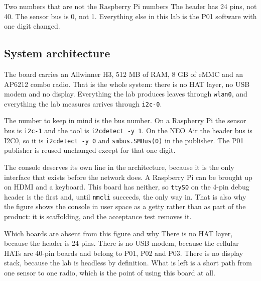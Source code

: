\begin{rulebox}{Two numbers that are not the Raspberry Pi numbers}
The header has 24 pins, not 40. The sensor bus is 0, not 1. Everything else in this lab is the P01 software with one digit changed.
\end{rulebox}

\subsection*{System architecture}


The board carries an Allwinner H3, 512 MB of RAM, 8 GB of eMMC and an AP6212 combo radio. That is the whole system: there is no HAT layer, no USB modem and no display. Everything the lab produces leaves through \texttt{wlan0}, and everything the lab measures arrives through \texttt{i2c-0}.

The number to keep in mind is the bus number. On a Raspberry Pi the sensor bus is \texttt{i2c-1} and the tool is \texttt{i2cdetect -y 1}. On the NEO Air the header bus is I2C0, so it is \texttt{i2cdetect -y 0} and \texttt{smbus.SMBus(0)} in the publisher. The P01 publisher is reused unchanged except for that one digit.

The console deserves its own line in the architecture, because it is the only interface that exists before the network does. A Raspberry Pi can be brought up on HDMI and a keyboard. This board has neither, so \texttt{ttyS0} on the 4-pin debug header is the first and, until \texttt{nmcli} succeeds, the only way in. That is also why the figure shows the console in user space as a getty rather than as part of the product: it is scaffolding, and the acceptance test removes it.

\begin{note}{Which boards are absent from this figure and why}
There is no HAT layer, because the header is 24 pins. There is no USB modem, because the cellular HATs are 40-pin boards and belong to P01, P02 and P03. There is no display stack, because the lab is headless by definition. What is left is a short path from one sensor to one radio, which is the point of using this board at all.
\end{note}

